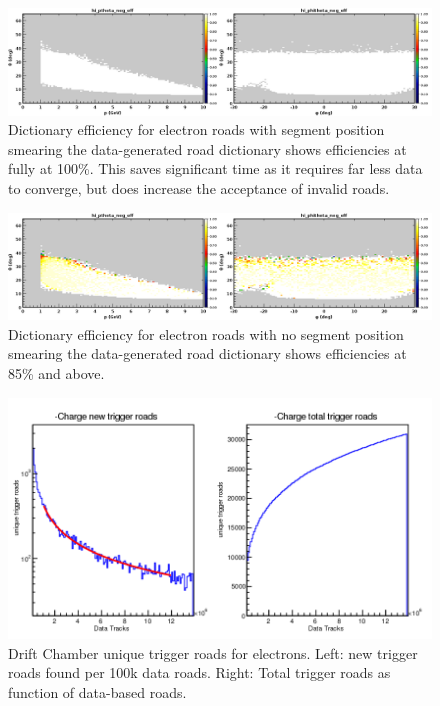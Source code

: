 \begin{figure}[hbt]
	\centering
	\includegraphics[width=1.0\columnwidth,keepaspectratio]{img/dc_neg_data_efficiency_smearing.png}
	\caption{Dictionary efficiency for electron roads with segment position smearing the data-generated road dictionary shows efficiencies at fully at 100\%. This saves significant time as it requires far less data to converge, but does increase the acceptance of invalid roads.}
	\label{fig:dc_neg_data_efficiency_smearing}
\end{figure}

\begin{figure}[hbt]
	\centering
	\includegraphics[width=1.0\columnwidth,keepaspectratio]{img/dc_neg_data_efficiency_nosmearing.png}
	\caption{Dictionary efficiency for electron roads with no segment position smearing the data-generated road dictionary shows efficiencies at 85\% and above.}
	\label{fig:dc_neg_data_efficiency_nosmearing}
\end{figure}

\begin{figure}[hbt]
	\centering
	\includegraphics[width=1.0\columnwidth,keepaspectratio]{img/dc_neg_data_dictionary.png}
	\caption{Drift Chamber unique trigger roads for electrons. Left: new trigger roads found per 100k data roads. Right: Total trigger roads as function of data-based roads.}
	\label{fig:dc_neg_data_dictionary}
\end{figure}


